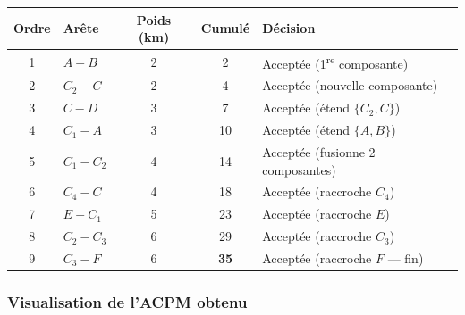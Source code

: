 \documentclass[12pt,a4paper]{article}
\begin{document}
\begin{center}\small
\setlength{\tabcolsep}{6pt}
\renewcommand{\arraystretch}{1.2}
\begin{tabular}{clccl}
\arrayrulecolor{SlateMid}
\toprule
\rowcolor{NavyDark}
{\color{white}\textbf{Ordre}} &
{\color{white}\textbf{Arête}} &
{\color{white}\textbf{Poids (km)}} &
{\color{white}\textbf{Cumulé}} &
{\color{white}\textbf{Décision}}\\
\midrule
1 & $A - B$       & 2 & 2  & Acceptée (1\textsuperscript{re} composante)\\
2 & $C_2 - C$     & 2 & 4  & Acceptée (nouvelle composante)\\
3 & $C - D$       & 3 & 7  & Acceptée (étend $\{C_2,C\}$)\\
4 & $C_1 - A$     & 3 & 10 & Acceptée (étend $\{A,B\}$)\\
5 & $C_1 - C_2$   & 4 & 14 & Acceptée (fusionne 2 composantes)\\
6 & $C_4 - C$     & 4 & 18 & Acceptée (raccroche $C_4$)\\
7 & $E - C_1$     & 5 & 23 & Acceptée (raccroche $E$)\\
8 & $C_2 - C_3$   & 6 & 29 & Acceptée (raccroche $C_3$)\\
9 & $C_3 - F$     & 6 & \textbf{35} & Acceptée (raccroche $F$ — fin)\\
\bottomrule
\end{tabular}
\end{center}

\subsubsection{Visualisation de l'ACPM obtenu}
\end{document}
